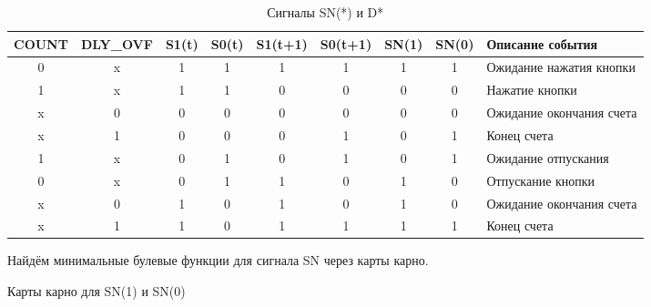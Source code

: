 \documentclass{bmstu}
\begin{document}
\begin{table}[ht]
	\begin{center}
	\caption{Сигналы SN(*) и D*}
	\begin{tabular}{|c|c|c|c|c|c|c|c|l|}
		\hline
		   \scriptsize{COUNT} & 
		   \scriptsize{DLY\_OVF} & S1(t) & S0(t) & S1(t+1) & S0(t+1) & SN(1) & SN(0) & \scriptsize{Описание события} \\
		\hline
		0     & x        & 1     & 1     & 1       & 1       & 1     & 1     &  \scriptsize{Ожидание нажатия кнопки}\\
		\hline
		1     & x        & 1     & 1     & 0       & 0       & 0     & 0     &  \scriptsize{Нажатие кнопки}\\
		\hline
		x     & 0        & 0     & 0     & 0       & 0       & 0     & 0     &  \scriptsize{Ожидание окончания счета}\\
		\hline
		x     & 1        & 0     & 0     & 0       & 1       & 0     & 1     &  \scriptsize{Конец счета}\\
		\hline
		1     & x        & 0     & 1     & 0       & 1       & 0     & 1     &  \scriptsize{Ожидание отпускания}\\
		\hline
		0     & x        & 0     & 1     & 1       & 0       & 1     & 0     &  \scriptsize{Отпускание кнопки}\\
		\hline
		x     & 0        & 1     & 0     & 1       & 0       & 1     & 0     &  \scriptsize{Ожидание окончания счета}\\
		\hline
		x     & 1        & 1     & 0     & 1       & 1       & 1     & 1     &  \scriptsize{Конец счета}\\
		\hline
	\end{tabular}
	\end{center}
\end{table}

Найдём минимальные булевые функции для сигнала SN через карты карно.

\begin{table}[ht]
\begin{center}
	\caption{Карты карно для SN(1) и SN(0)}
	
	\begin{karnaugh-map}
	\end{karnaugh-map}
	\quad
	\begin{karnaugh-map}
	\end{karnaugh-map}
\end{center}
\end{table}
\end{document}

